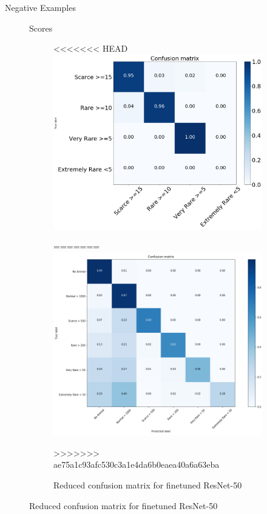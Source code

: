 \documentclass[10pt]{beamer}
\begin{document}
\begin{frame}{Negative Examples}
\begin{figure}
\begin{frame}{Scores}
	\centering
	\begin{minipage}[c]{0.58\linewidth}
		\begin{figure}
<<<<<<< HEAD
			\includegraphics[width=\columnwidth]{images/conf_mat_leo_v2.png}
			\caption{Confusion matrix for finetuned Resnet-50}
=======
			\includegraphics[width=\columnwidth]{images/conf_mat_simple.png}
			\caption{Reduced confusion matrix for finetuned ResNet-50}
>>>>>>> ae75a1c93afc530c3a1e4da6b0eaea40a6a63eba

\end{figure}
\end{minipage}
\end{frame}
\end{figure}
\end{frame}
\end{document}
